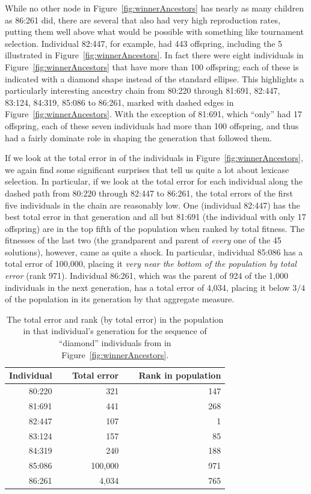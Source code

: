 While no other node in Figure~\ref{fig:winnerAncestors} has nearly as many children as 86:261 did,
there are several that also had very high reproduction rates, putting them well above what would be 
possible with something like tournament selection. Individual 82:447, for example, had
443 offspring, including the 5 illustrated in Figure~\ref{fig:winnerAncestors}. In fact there were
eight individuals in Figure~\ref{fig:winnerAncestors} that have more than 100 offspring; each of
these is indicated with a diamond shape instead of the standard ellipse. This highlights a particularly
interesting ancestry chain from 80:220 through 81:691, 82:447, 83:124, 84:319, 85:086 to 86:261, marked with
dashed edges in Figure~\ref{fig:winnerAncestors}. With the exception of 81:691, which ``only'' had 17
offspring, each of these seven individuals had more
than 100 offspring, and thus had a fairly dominate role in shaping the generation that followed them. 

If we look at the total error in of the individuals in Figure~\ref{fig:winnerAncestors}, we again
find some significant surprises that tell us quite a lot about lexicase selection. In particular, if
we look at the total error for each individual along the dashed path from 80:220 through
82:447 to 86:261, the total errors of the first five
individuals in the chain are reasonably low. One (individual 82:447) has the best total error in
that generation and all but 81:691 (the individual with only 17 offspring) are in the top fifth of the 
population when ranked by total fitness. The fitnesses 
of the last two (the grandparent and parent of \emph{every} one of the 45 solutions), however, 
came as quite a shock. In particular, individual 85:086 has a total error of 100,000, placing it
\emph{very near the bottom of the population by total error} (rank 971). Individual 86:261, which was
the parent of 924 of the 1,000 individuals in the next generation, has a total error of 4,034, placing
it below $3/4$ of the population in its generation by that aggregate measure.

\begin{table}[t]
	\caption{The total error and rank (by total error) in the population in that individual's generation
		for the sequence of ``diamond'' individuals from in Figure~\ref{fig:winnerAncestors}.}
	\label{table:winnerFitnesses}
	\begin{center}
	\begin{tabular}{rrr}
		Individual & $\quad$ Total error & $\quad$ Rank in population \\
		\hline\noalign{\smallskip}
		80:220 & 321 & 147 \\
		81:691 & 441 & 268 \\
		82:447 & 107 & 1 \\
		83:124 & 157 & 85 \\
		84:319 & 240 & 188 \\
		85:086 & 100,000 & 971 \\
		86:261 & 4,034 & 765
	\end{tabular}
	\end{center}
\end{table}

